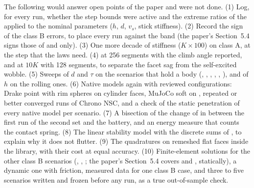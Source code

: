 The following would answer open points of the paper and were not done. (1) Log, for every run,
whether the step bounds were active and the extreme ratios of the applied to the nominal
parameters ($h$, $d$, $v_s$, stick stiffness). (2) Record the sign of the class B errors, to
place every run against the band (the paper's Section~5.4 signs those of  and
 only). (3) One more decade of stiffness ($K\times100$) on class A,
at the step that the laws need. (4)  at 256 segments with the climb angle
reported, and  at $10K$ with 128 segments, to separate the facet sag from the
self-excited wobble. (5) Sweeps of $d$ and $\tau$ on the scenarios that hold a body
(, , , , , ), and of $h$ on the
rolling ones. (6) Native models again with reviewed configurations: Drake point with rim
spheres on cylinder faces, MuJoCo soft on , repeated or better converged runs of
Chrono NSC, and a check of the static penetration of every native model per scenario. (7) A
bisection of the change of  in  between the first run of the second
set and the battery, and an energy measure that counts the contact spring. (8) The linear
stability model with the discrete sums of , to explain why it does not flutter. (9)
The quadratures on remeshed flat faces inside the library, with their cost at equal accuracy.
(10) Finite-element solutions for the other class B scenarios (, ,
; the paper's Section~5.4 covers  and , statically), a
dynamic one with friction, measured data for one class B case, and three to five scenarios
written and frozen before any run, as a true out-of-sample check.
